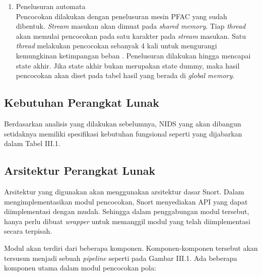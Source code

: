 \begin{enumerate}
      \item
      Penelusuran automata \\
      Pencocokan dilakukan dengan penelusuran mesin PFAC yang sudah dibentuk. \emph{Stream} masukan akan dimuat pada \emph{shared memory}. Tiap \emph{thread} akan memulai pencocokan pada satu karakter pada \emph{stream} masukan. Satu \emph{thread} melakukan pencocokan sebanyak 4 kali untuk mengurangi kemungkinan ketimpangan beban \citep{lin2013}. Penelusuran dilakukan hingga mencapai state akhir. Jika state akhir bukan merupakan state dummy, maka hasil pencocokan akan diset pada tabel hasil yang berada di \emph{global memory}.

      \end{enumerate}

    \subsection{Kebutuhan Perangkat Lunak}

      Berdasarkan analisis yang dilakukan sebelumnya, NIDS yang akan dibangun setidaknya memiliki spesifikasi kebutuhan fungsional seperti yang dijabarkan dalam Tabel III.1.
      
      



    \subsection{Arsitektur Perangkat Lunak}

      Arsitektur yang digunakan akan menggunakan arsitektur dasar Snort. Dalam mengimplementasikan modul pencocokan, Snort menyediakan API yang dapat diimplementasi dengan mudah. Sehingga dalam penggabungan modul tersebut, hanya perlu dibuat \emph{wrapper} untuk memanggil modul yang telah diimplementasi secara terpisah.

      Modul akan terdiri dari beberapa komponen. Komponen-komponen tersebut akan tersusun menjadi sebuah \emph{pipeline} seperti pada Gambar III.1. Ada beberapa komponen utama dalam modul pencocokan pola:

      
      
